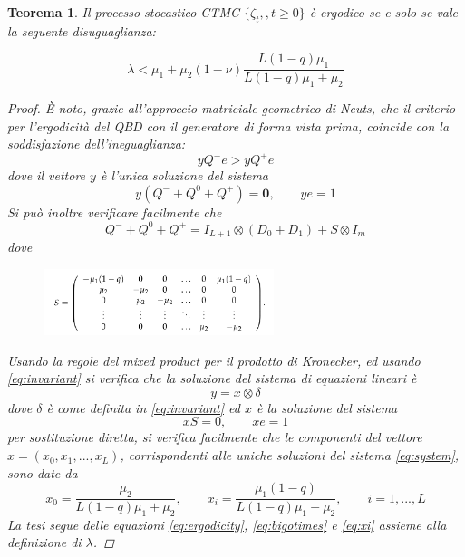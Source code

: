\documentclass[11pt]{article}
\newtheorem{teorema}{Teorema}[section]
\begin{document}
\begin{teorema}
    Il processo stocastico CTMC $\{\zeta_t,,t\geq 0\}$ è ergodico se e solo se vale la seguente disuguaglianza:

    \begin{equation}\label{eq:ergodicity}
        \lambda < \mu_1 + \mu_2(1 - \nu) \frac{L(1-q)\mu_1}{L(1-q)\mu_1 + \mu_2}
    \end{equation}

    \begin{proof}
        È noto, grazie all'approccio matriciale-geometrico di Neuts, che il criterio per l'ergodicità del QBD con il generatore di forma vista prima, coincide con la soddisfazione dell'ineguaglianza:
        \begin{equation}\label{eq:ergodicity}
            y Q^- e > y Q^+e
        \end{equation}
        dove il vettore $y$ è l'unica soluzione del sistema
        \begin{equation}
            y(Q^- + Q^0 + Q^+) = \textbf{0}, \qquad ye = 1
        \end{equation}
        Si può inoltre verificare facilmente che
        \begin{equation}\label{eq:bigotimes}
            Q^- + Q^0 + Q^+ = I_{L+1} \otimes (D_0 + D_1) + S \otimes I_{m}
        \end{equation}
        dove
        \begin{figure}[h!]
            \centering
            \includegraphics[width=0.6\textwidth]{lLnSEzP.png}
        \end{figure}
        Usando la regole del mixed product per il prodotto di Kronecker, ed usando \ref{eq:invariant} si verifica che la soluzione del sistema di equazioni lineari è
        \begin{equation}
            y = x \otimes \delta
        \end{equation}
        dove $\delta$ è come definita in \ref{eq:invariant} ed $x$ è la soluzione del sistema
        \begin{equation}\label{eq:system}
            xS = 0, \qquad xe = 1
        \end{equation}
        per sostituzione diretta, si verifica facilmente che le componenti del vettore $x = (x_0, x_1, ... , x_L)$, corrispondenti alle uniche soluzioni del sistema \ref{eq:system}, sono date da
        \begin{equation}\label{eq:xi}
            x_0 = \frac{\mu_2}{L(1-q)\mu_1 + \mu_2}, \qquad x_i = \frac{\mu_1(1-q)}{L(1-q)\mu_1 + \mu_2}, \qquad i = 1, ..., L
        \end{equation}
        La tesi segue delle equazioni \ref{eq:ergodicity}, \ref{eq:bigotimes} e \ref{eq:xi} assieme alla definizione di $\lambda$.
    \end{proof}

\end{teorema}
\end{document}
